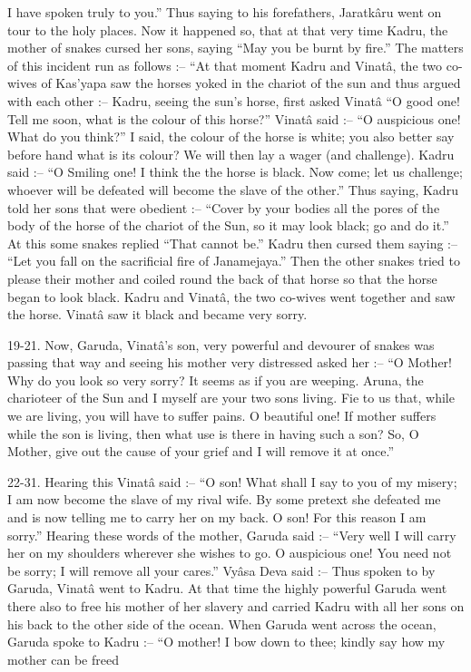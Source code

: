 I have spoken truly to you.” Thus saying to his forefathers, Jaratkâru went on tour to the holy places. Now it happened so, that at that very time Kadru, the mother of snakes cursed her sons, saying “May you be burnt by fire.” The matters of this incident run as follows :-- “At that moment Kadru and Vinatâ, the two co-wives of Kas'yapa saw the horses yoked in the chariot of the sun and thus argued with each other :-- Kadru, seeing the sun's horse, first asked Vinatâ “O good one! Tell me soon, what is the colour of this horse?” Vinatâ said :-- “O auspicious one! What do you think?” I said, the colour of the horse is white; you also better say before hand what is its colour? We will then lay a wager (and challenge). Kadru said :-- “O Smiling one! I think the the horse is black. Now come; let us challenge; whoever will be defeated will become the slave of the other.” Thus saying, Kadru told her sons that were obedient :-- “Cover by your bodies all the pores of the body of the horse of the chariot of the Sun, so it may look black; go and do it.” At this some snakes replied “That cannot be.” Kadru then cursed them saying :-- “Let you fall on the sacrificial fire of Janamejaya.” Then the other snakes tried to please their mother and coiled round the back of that horse so that the horse began to look black. Kadru and Vinatâ, the two co-wives went together and saw the horse. Vinatâ saw it black and became very sorry.

 

19-21. Now, Garuda, Vinatâ's son, very powerful and devourer of snakes was passing that way and seeing his mother very distressed asked her :-- “O Mother! Why do you look so very sorry? It seems as if you are weeping. Aruna, the charioteer of the Sun and I myself are your two sons living. Fie to us that, while we are living, you will have to suffer pains. O beautiful one! If mother suffers while the son is living, then what use is there in having such a son? So, O Mother, give out the cause of your grief and I will remove it at once.”

 

22-31. Hearing this Vinatâ said :-- “O son! What shall I say to you of my misery; I am now become the slave of my rival wife. By some pretext she defeated me and is now telling me to carry her on my back. O son! For this reason I am sorry.” Hearing these words of the mother, Garuda said :-- “Very well I will carry her on my shoulders wherever she wishes to go. O auspicious one! You need not be sorry; I will remove all your cares.” Vyâsa Deva said :-- Thus spoken to by Garuda, Vinatâ went to Kadru. At that time the highly powerful Garuda went there also to free his mother of her slavery and carried Kadru with all her sons on his back to the other side of the ocean. When Garuda went across the ocean, Garuda spoke to Kadru :-- “O mother! I bow down to thee; kindly say how my mother can be freed

